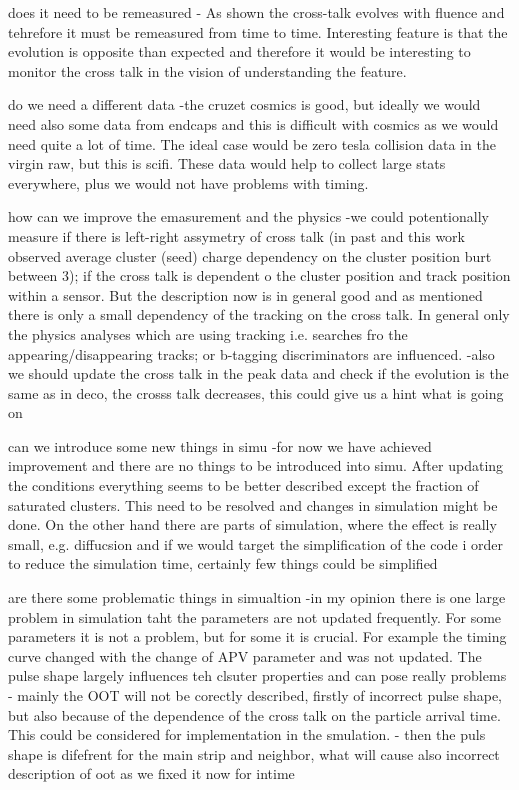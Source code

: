 does it need to be remeasured
	- As shown the cross-talk evolves with fluence and tehrefore it must be remeasured from time to time.  Interesting feature is that the evolution is opposite than expected and therefore it would be interesting to monitor the cross talk in the vision of understanding the feature.

do we need a different data
	-the cruzet cosmics is good, but ideally we would need also some data from endcaps and this is difficult with cosmics as we would need quite a lot of time. The ideal case would be zero tesla collision data in the virgin raw, but this is scifi. These data would help to collect large stats everywhere, plus we would not have problems with timing.

how can we improve the emasurement and the physics
	-we could potentionally measure if there is left-right assymetry of cross talk (in past and this work observed average cluster (seed) charge dependency on the cluster position burt between 3); if the cross talk is dependent o the cluster position and track position within a sensor. But the description now is in general good and as mentioned there is only a small dependency of the tracking on the cross talk. In general only the physics analyses which are using tracking i.e. searches fro the appearing/disappearing tracks; or b-tagging discriminators are influenced.
	-also we should update the cross talk in the peak data and check if the evolution is the same as in deco, the crosss talk decreases, this could give us a hint what is going on

can we introduce some new things in simu
	-for now we have achieved improvement and there are no things to be introduced into simu. After updating the conditions everything seems to be better described except the fraction of saturated clusters. This need to be resolved and changes in simulation might be done. On the other hand there are parts of simulation, where the effect is really small, e.g. diffucsion and if we would target the simplification of the code i order to reduce the simulation time, certainly few things could be simplified
 
are there some problematic things in simualtion
 -in my opinion there is one large problem in simulation taht the parameters are not updated frequently. For some parameters it is not a problem, but for some it is crucial. For example the timing curve changed with the change of APV parameter and was not updated. The pulse shape largely influences teh clsuter properties and can pose really problems
	- mainly the OOT will not be corectly described, firstly of incorrect pulse shape, but also because of the dependence of the cross talk on the particle arrival time. This could be considered for implementation in the smulation.
	- then the puls shape is difefrent for the main strip and neighbor, what will cause also incorrect description of oot as we fixed it now for intime

